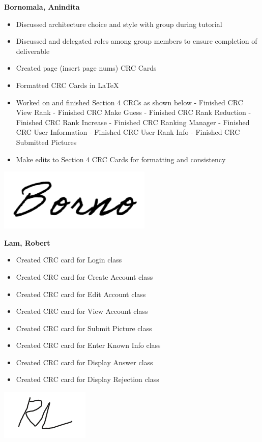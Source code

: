 \documentclass[]{article}
\begin{document}
\textbf{Bornomala, Anindita}
\begin{itemize}
        \item Discussed architecture choice and style with group during tutorial
        \item Discussed and delegated roles among group members to ensure completion of deliverable
        \item Created page (insert page nums) CRC Cards
		\item Formatted CRC Cards in LaTeX
		\item Worked on and finished Section 4 CRCs as shown below
            \subitem - Finished CRC View Rank
            \subitem - Finished CRC Make Guess
            \subitem - Finished CRC Rank Reduction
            \subitem - Finished CRC Rank Increase
            \subitem - Finished CRC Ranking Manager
			\subitem - Finished CRC User Information
			\subitem - Finished CRC User Rank Info
			\subitem - Finished CRC Submitted Pictures
		\item Make edits to Section 4 CRC Cards for formatting and consistency

\end{itemize}
\includegraphics[scale=0.50]{bornosignature.png}

\textbf{Lam, Robert}
\begin{itemize}
        \item Created CRC card for Login class
		\item Created CRC card for Create Account class
		\item Created CRC card for Edit Account class
		\item Created CRC card for View Account class
		\item Created CRC card for Submit Picture class
		\item Created CRC card for Enter Known Info class
		\item Created CRC card for Display Answer class
		\item Created CRC card for Display Rejection class
\end{itemize}
\includegraphics[scale=1]{robertsignature.png}

\end{document}
